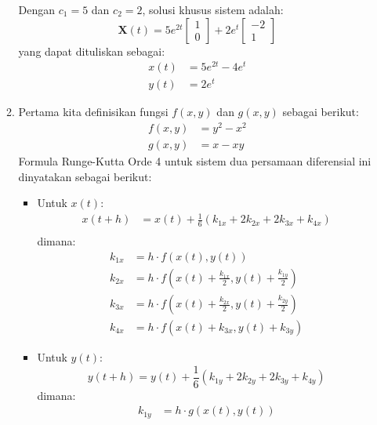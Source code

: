 \documentclass{article}
\begin{document}
\begin{enumerate}
\begin{enumerate}[label=\alph*.]
            Dengan \( c_1 = 5 \) dan \( c_2 = 2 \), solusi khusus sistem adalah:
            \[
            \mathbf{X}(t) = 5 e^{2t} \begin{bmatrix} 1 \\ 0 \end{bmatrix} + 2 e^{t} \begin{bmatrix} -2 \\ 1 \end{bmatrix}
            \]
            yang dapat dituliskan sebagai:
            \begin{align*}
                x(t) &= 5 e^{2t} - 4 e^{t} \\
                y(t) &= 2 e^{t}
            \end{align*}
            \item Pertama kita definisikan fungsi \( f(x,y) \) dan \( g(x,y) \) sebagai berikut:
            \begin{align*}
                f(x,y) &= y^2 - x^2\\
                g(x,y) &= x - xy
            \end{align*}
            Formula Runge-Kutta Orde 4 untuk sistem dua persamaan diferensial ini dinyatakan sebagai berikut:
            \begin{itemize}
                \item Untuk \( x(t) \):
                \begin{align*}
                    x(t + h) &= x(t) + \frac{1}{6}(k_{1x} + 2k_{2x} + 2k_{3x} + k_{4x}) \\
                \end{align*}
                dimana:
                \begin{align*}
                    k_{1x} &= h \cdot f(x(t), y(t)) \\
                    k_{2x} &= h \cdot f\left(x(t) + \frac{k_{1x}}{2}, y(t) + \frac{k_{1y}}{2}\right) \\
                    k_{3x} &= h \cdot f\left(x(t) + \frac{k_{2x}}{2}, y(t) + \frac{k_{2y}}{2}\right) \\
                    k_{4x} &= h \cdot f(x(t) + k_{3x}, y(t) + k_{3y})
                \end{align*}
                \item Untuk \( y(t) \):
                \[
                y(t + h) = y(t) + \frac{1}{6}(k_{1y} + 2k_{2y} + 2k_{3y} + k_{4y})
                \]
                dimana:
                \begin{align*}
                    k_{1y} &= h \cdot g(x(t), y(t)) \\

\end{align*}
\end{itemize}
\end{enumerate}
\end{enumerate}
\end{document}
